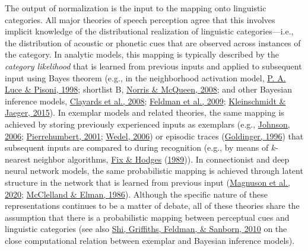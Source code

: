 \documentclass[
  11pt,
  english,
  man,floatsintext]{apa6}
\begin{document}
The output of normalization is the input to the mapping onto linguistic categories. All major theories of speech perception agree that this involves implicit knowledge of the distributional realization of linguistic categories---i.e., the distribution of acoustic or phonetic cues that are observed across instances of the category. In analytic models, this mapping is typically described by the \emph{category likelihood} that is learned from previous inputs and applied to subsequent input using Bayes theorem (e.g., in the neighborhood activation model, \protect\hyperlink{ref-luce-pisoni1998}{P. A. Luce \& Pisoni, 1998}; shortlist B, \protect\hyperlink{ref-norris-mcqueen2008}{Norris \& McQueen, 2008}; and other Bayesian inference models, \protect\hyperlink{ref-clayards2008}{Clayards et al., 2008}; \protect\hyperlink{ref-feldman2009}{Feldman et al., 2009}; \protect\hyperlink{ref-kleinschmidt-jaeger2015}{Kleinschmidt \& Jaeger, 2015}). In exemplar models and related theories, the same mapping is achieved by storing previously experienced inputs as exemplars (e.g., \protect\hyperlink{ref-johnson2006}{Johnson, 2006}; \protect\hyperlink{ref-pierrehumbert2001}{Pierrehumbert, 2001}; \protect\hyperlink{ref-wedel2006}{Wedel, 2006}) or episodic traces (\protect\hyperlink{ref-goldinger1996}{Goldinger, 1996}) that subsequent inputs are compared to during recognition (e.g., by means of \(k\)-nearest neighbor algorithms, \protect\hyperlink{ref-fix-hodges1989}{Fix \& Hodges} (\protect\hyperlink{ref-fix-hodges1989}{1989})). In connectionist and deep neural network models, the same probabilistic mapping is achieved through latent structure in the network that is learned from previous input (\protect\hyperlink{ref-magnuson2020}{Magnuson et al., 2020}; \protect\hyperlink{ref-mcclelland-elman1986}{McClelland \& Elman, 1986}). Although the specific nature of these representations continues to be a matter of debate, all of these theories share the assumption that there is a probabilistic mapping between perceptual cues and linguistic categories (see also \protect\hyperlink{ref-shi2010}{Shi, Griffiths, Feldman, \& Sanborn, 2010} on the close computational relation between exemplar and Bayesian inference models).
\end{document}
